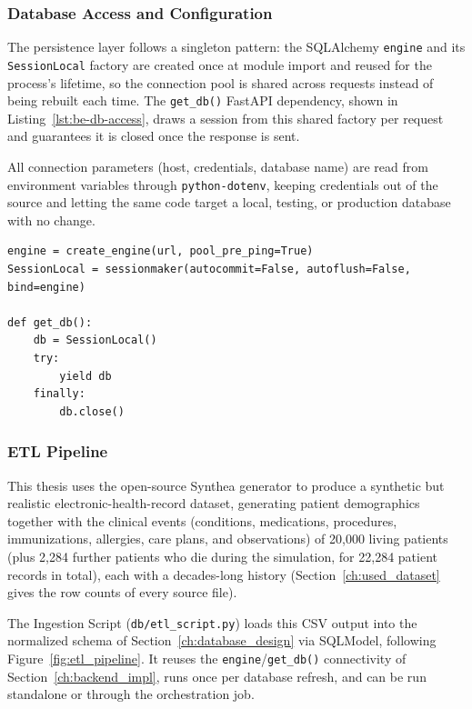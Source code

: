 \subsubsection*{Database Access and Configuration}

\vspace{0.25cm}

The persistence layer follows a singleton pattern: the SQLAlchemy \texttt{engine} and its \texttt{SessionLocal} factory are created once at module import and reused for the process's lifetime, so the connection pool is shared across requests instead of being rebuilt each time. The \texttt{get\_db()} FastAPI dependency, shown in Listing~\ref{lst:be-db-access}, draws a session from this shared factory per request and guarantees it is closed once the response is sent.

All connection parameters (host, credentials, database name) are read from environment variables through \texttt{python-dotenv}, keeping credentials out of the source and letting the same code target a local, testing, or production database with no change.

\begin{lstlisting}[style=pythonstyle, caption={Singleton engine/session factory and the request-scoped session dependency}, label={lst:be-db-access}]
engine = create_engine(url, pool_pre_ping=True)
SessionLocal = sessionmaker(autocommit=False, autoflush=False, bind=engine)

def get_db():
    db = SessionLocal()
    try:
        yield db
    finally:
        db.close()
\end{lstlisting}

\subsubsection{ETL Pipeline}
\label{ch:etl_impl}

This thesis uses the open-source Synthea generator to produce a synthetic but realistic electronic-health-record dataset, generating patient demographics together with the clinical events (conditions, medications, procedures, immunizations, allergies, care plans, and observations) of 20{,}000 living patients (plus 2{,}284 further patients who die during the simulation, for 22{,}284 patient records in total), each with a decades-long history (Section~\ref{ch:used_dataset} gives the row counts of every source file).

The Ingestion Script (\texttt{db/etl\_script.py}) loads this CSV output into the normalized schema of Section~\ref{ch:database_design} via SQLModel, following Figure~\ref{fig:etl_pipeline}. It reuses the \texttt{engine}/\texttt{get\_db()} connectivity of Section~\ref{ch:backend_impl}, runs once per database refresh, and can be run standalone or through the orchestration job.

